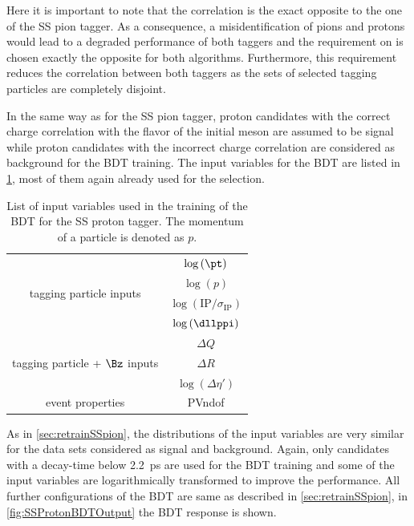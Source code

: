 Here it is important to note that the correlation is the exact opposite to the one of the SS pion tagger.
As a consequence, a misidentification of pions and protons would lead to a degraded performance of both taggers and the requirement on \dllppi is chosen exactly the opposite for both algorithms.
Furthermore, this requirement reduces the correlation between both taggers as the sets of selected tagging particles are completely disjoint.

In the same way as for the SS pion tagger, proton candidates with the correct charge correlation with the flavor of the initial \B meson are assumed to be signal while proton candidates with the incorrect charge correlation are considered as background for the BDT training.
The input variables for the BDT are listed in \cref{tab:BDTInputSSProton}, most of them again already used for the selection.
\begin{table}[tbp]
	\centering
	\caption{List of input variables used in the training of the BDT for the SS proton tagger.
	The momentum of a particle is denoted as $p$.}
	\begin{tabular}{cc}
		\toprule
		\multirow{4}{*}{tagging particle inputs} 	&	$\log\left(\pt\right)$ \\
													&	$\log\left(p\right)$\\
													&	$\log\left(\text{IP}/\sigma_\text{IP}\right)$\\
													&	$\log\left(\dllppi\right)$\\
		\midrule
		\multirow{3}{*}{tagging particle + $\Bz$ inputs} 	& $\Delta Q$\\
															& $\Delta R$\\
															& $\log\left(\Delta\eta'\right)$\\
		\midrule
		\multirow{1}{*}{event properties} 	& PVndof\\
		\bottomrule
	\end{tabular}
	\label{tab:BDTInputSSProton}
\end{table}
As in \cref{sec:retrainSSpion}, the distributions of the input variables are very similar for the data sets considered as signal and background.
Again, only \B candidates with a decay-time below \SI{2.2}{\pico\second} are used for the BDT training and some of the input variables are logarithmically transformed to improve the performance.
All further configurations of the BDT are same as described in \cref{sec:retrainSSpion}, in \cref{fig:SSProtonBDTOutput} the BDT response is shown.
